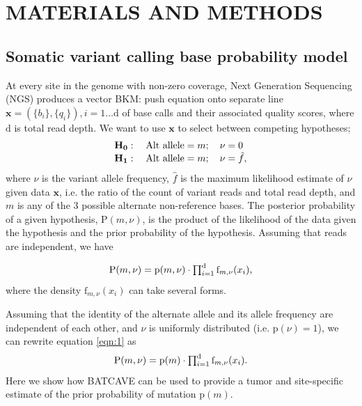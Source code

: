 \documentclass[a4,center,fleqn]{NAR}
\newcommand{\bkmcomment}[1]{{\color{blue}BKM: #1}}
\newcommand{\batcave}{BATCAVE }
\begin{document}
\section{MATERIALS AND METHODS}
\subsection{Somatic variant calling base probability model}

At every site in the genome with non-zero coverage, Next Generation Sequencing (NGS) produces a vector \bkmcomment{push equation onto separate line} $\mathbf{x}  = (\{b_i\},\{q_i\}), i = 1\dots \mathrm{d}$ of base calls and their associated quality scores, where $\mathrm{d}$ is total read depth.
We want to use $\mathbf{x}$ to select between competing hypotheses;
\begin{equation}
  \label{eqn:hypothesis}
$$
  \begin{array}{l}
    \mathbf{H_0}:\quad \textrm{Alt allele} = m;\quad\nu = 0\\
    \mathbf{H_1}:\quad \textrm{Alt allele} = m;\quad\nu = \hat{f},
  \end{array}
$$
\end{equation}
where $\nu$ is the variant allele frequency, $\hat{f}$ is the maximum likelihood estimate of $\nu$ given data $\mathbf{x}$, i.e. the ratio of the count of variant reads and total read depth, and $m$ is any of the 3 possible alternate non-reference bases.
The posterior probability of a given hypothesis, $\mathrm{P}(m,\nu)$, is the product of the likelihood of the data given the hypothesis and the prior probability of the hypothesis. 
Assuming that reads are independent, we have

\begin{equation}
  \label{eqn:1}
$$
  \mathrm{P}(m,\nu) = \mathrm{p}(m,\nu) \cdot \prod_{i=1}^{\mathrm{d}} \textrm{f}_{m,\nu}(x_i),
$$
\end{equation}
where the density $\textrm{f}_{m,\nu}(x_i)$ can take several forms.

Assuming that the identity of the alternate allele and its allele frequency are independent of each other, and $\nu$ is uniformly distributed (i.e. $\mathrm{p}(\nu) = 1$), we can rewrite equation \ref{eqn:1} as
\begin{equation}
  \label{eqn:2}
$$
  \mathrm{P}(m,\nu) = \mathrm{p}(m) \cdot \prod_{i=1}^{\mathrm{d}} \textrm{f}_{m,\nu}(x_i).
$$
\end{equation}
Here we show how \batcave can be used to provide a tumor and site-specific estimate of the prior probability of mutation $\mathrm{p}(m)$.
\end{document}
